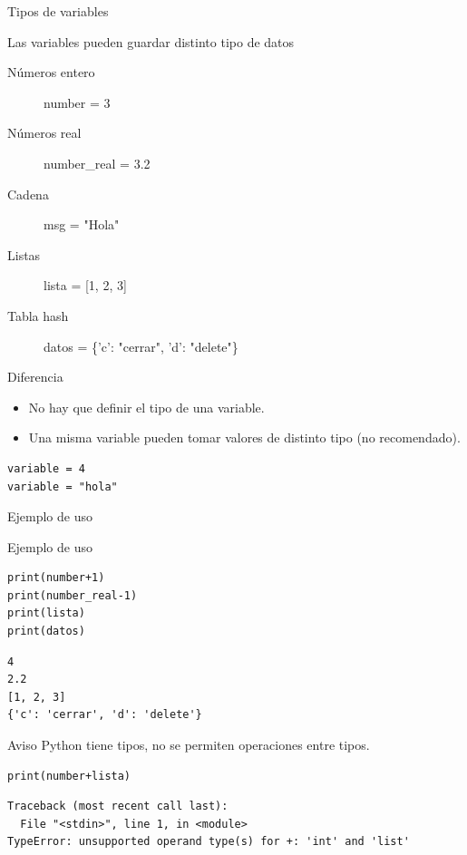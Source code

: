 \documentclass[bigger,unknownkeysallowed]{beamer}
\begin{document}
\begin{frame}[fragile,label={sec:orgb6eefcf}]{Tipos de variables}
 \begin{block}{Las variables pueden guardar distinto tipo de datos}
\begin{description}
\item[{Números entero}] number = 3
\item[{Números real }] number\_real = 3.2
\item[{Cadena}] msg = "Hola"
\item[{Listas}] lista = [1, 2, 3]
\item[{Tabla hash}] datos = \{'c': "cerrar", 'd': "delete"\}
\end{description}
\end{block}

\begin{alertblock}{Diferencia}
\begin{itemize}
\item No hay que definir el tipo de una variable.
\item Una misma variable pueden tomar valores de distinto tipo (no recomendado).
\end{itemize}
\end{alertblock}

\begin{verbatim}
variable = 4
variable = "hola"
\end{verbatim}
\end{frame}

\begin{frame}[fragile,label={sec:org15c7a98}]{Ejemplo de uso}
 \begin{block}{Ejemplo de uso}
\begin{verbatim}
print(number+1)
print(number_real-1)
print(lista)
print(datos)
\end{verbatim}
\scriptsize
\begin{verbatim}
4
2.2
[1, 2, 3]
{'c': 'cerrar', 'd': 'delete'}
\end{verbatim}
\end{block}

\begin{alertblock}{Aviso}
Python tiene tipos, no se permiten operaciones entre tipos.
\end{alertblock}
\begin{block}{}
\begin{verbatim}
print(number+lista)
\end{verbatim}
\scriptsize
\begin{verbatim}
Traceback (most recent call last):
  File "<stdin>", line 1, in <module>
TypeError: unsupported operand type(s) for +: 'int' and 'list'
\end{verbatim}
\end{block}
\end{frame}
\end{document}
